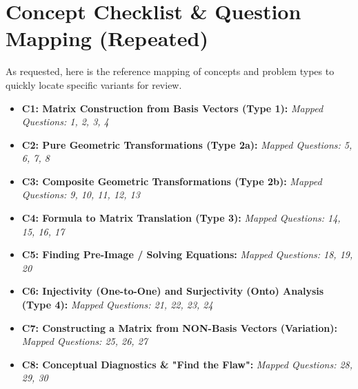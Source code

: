 \documentclass[12pt]{article}
\begin{document}
\clearpage

\section{Concept Checklist \& Question Mapping (Repeated)}
\label{sec:checklist_end}
As requested, here is the reference mapping of concepts and problem types to quickly locate specific variants for review.

\begin{itemize}
    \item \textbf{C1: Matrix Construction from Basis Vectors (Type 1):} 
    \textit{Mapped Questions: 1, 2, 3, 4}
    
    \item \textbf{C2: Pure Geometric Transformations (Type 2a):} 
    \textit{Mapped Questions: 5, 6, 7, 8}
    
    \item \textbf{C3: Composite Geometric Transformations (Type 2b):} 
    \textit{Mapped Questions: 9, 10, 11, 12, 13}
    
    \item \textbf{C4: Formula to Matrix Translation (Type 3):} 
    \textit{Mapped Questions: 14, 15, 16, 17}
    
    \item \textbf{C5: Finding Pre-Image / Solving Equations:} 
    \textit{Mapped Questions: 18, 19, 20}
    
    \item \textbf{C6: Injectivity (One-to-One) and Surjectivity (Onto) Analysis (Type 4):} 
    \textit{Mapped Questions: 21, 22, 23, 24}
    
    \item \textbf{C7: Constructing a Matrix from NON-Basis Vectors (Variation):} 
    \textit{Mapped Questions: 25, 26, 27}
    
    \item \textbf{C8: Conceptual Diagnostics \& "Find the Flaw":} 
    \textit{Mapped Questions: 28, 29, 30}
\end{itemize}
\end{document}
